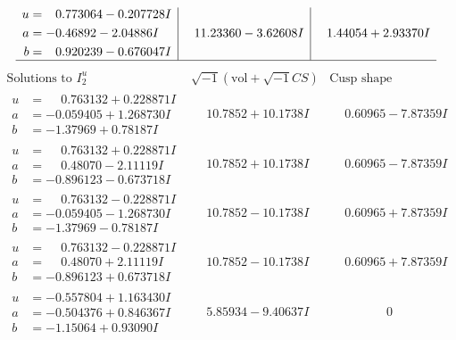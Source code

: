 \documentclass[1p]{elsarticle_modified}
\theoremstyle{definition}
\newcommand{\I}{\sqrt{-1}}
\begin{document}
$$\begin{array}{c|c|c}
\begin{aligned}
u &= \phantom{-}0.773064 - 0.207728 I \\
a &= -0.46892 - 2.04886 I \\
b &= \phantom{-}0.920239 - 0.676047 I\end{aligned}
 & \phantom{-}11.23360 - 3.62608 I & \phantom{-}1.44054 + 2.93370 I\\
 \hline 
 \end{array}$$\newpage$$\begin{array}{c|c|c}  
\text{Solutions to }I^u_{2}& \I (\text{vol} + \sqrt{-1}CS) & \text{Cusp shape}\\
 \hline 
\begin{aligned}
u &= \phantom{-}0.763132 + 0.228871 I \\
a &= -0.059405 + 1.268730 I \\
b &= -1.37969 + 0.78187 I\end{aligned}
 & \phantom{-}10.7852 + 10.1738 I & \phantom{-}0.60965 - 7.87359 I \\ \hline\begin{aligned}
u &= \phantom{-}0.763132 + 0.228871 I \\
a &= \phantom{-}0.48070 - 2.11119 I \\
b &= -0.896123 - 0.673718 I\end{aligned}
 & \phantom{-}10.7852 + 10.1738 I & \phantom{-}0.60965 - 7.87359 I \\ \hline\begin{aligned}
u &= \phantom{-}0.763132 - 0.228871 I \\
a &= -0.059405 - 1.268730 I \\
b &= -1.37969 - 0.78187 I\end{aligned}
 & \phantom{-}10.7852 - 10.1738 I & \phantom{-}0.60965 + 7.87359 I \\ \hline\begin{aligned}
u &= \phantom{-}0.763132 - 0.228871 I \\
a &= \phantom{-}0.48070 + 2.11119 I \\
b &= -0.896123 + 0.673718 I\end{aligned}
 & \phantom{-}10.7852 - 10.1738 I & \phantom{-}0.60965 + 7.87359 I \\ \hline\begin{aligned}
u &= -0.557804 + 1.163430 I \\
a &= -0.504376 + 0.846367 I \\
b &= -1.15064 + 0.93090 I\end{aligned}
 & \phantom{-}5.85934 - 9.40637 I & \phantom{-0.000000 } 0 \\ \hline\begin{aligned}

\end{aligned}
\end{array}$$
\end{document}
